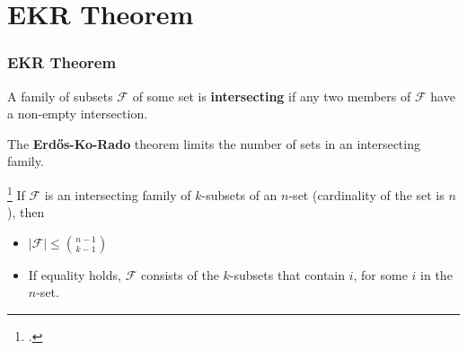\documentclass[10pt,]{beamer}
\theoremstyle{conjectureStyle}
\theoremstyle{notationStyle}
\theoremstyle{claimStyle}
\begin{document}
\section{EKR Theorem}
\begin{frame}\frametitle{EKR Theorem}
    \begin{definition}
        A family of subsets $\mathcal{F}$ of some set is \textbf{intersecting} if any two members of $\mathcal{F}$ have a non-empty intersection.
    \end{definition}
    \pause
    The \textbf{Erd\H{o}s-Ko-Rado} theorem limits the number of sets in an intersecting family.
    \begin{theorem}
        \footcite{Erds1961INTERSECTIONTF} If $\mathcal{F}$ is an intersecting family of $k$-subsets of an $n$-set (cardinality of the set is $n$), then
        \begin{itemize}
            \item $|\mathcal{F}| \leq \binom{n - 1}{k - 1}$
            \item If equality holds, $\mathcal{F}$ consists of the $k$-subsets that contain $i$, for some $i$ in the $n$-set.
        \end{itemize}
    \end{theorem}
\end{frame}
\end{document}
